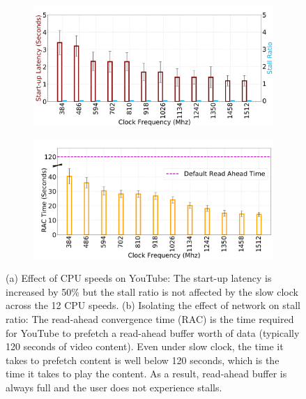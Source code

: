 \begin{figure}
    \begin{subfigure}[b]{0.5\textwidth}
        \centering
        \includegraphics[height=0.5\textwidth,width=1\textwidth]{sections/device-work/youtube-clock}
        \caption{}
    \end{subfigure}
    \begin{subfigure}[b]{0.5\textwidth}
        \centering
        \includegraphics[height=0.5\textwidth,width=1\textwidth]{sections/device-work/youtube-rac}
        \caption{}
    \end{subfigure}%
    \caption{(a) Effect of CPU speeds on YouTube: The start-up latency is increased by 50\% but the stall ratio is not affected by the slow clock across the 12 CPU speeds. (b) Isolating the effect of network on stall ratio: The read-ahead convergence time (RAC) is the time required for YouTube to prefetch a read-ahead buffer worth of data (typically 120 seconds of video content). Even under slow clock, the time it takes to prefetch content is well below 120 seconds, which is the time it takes to play the content. As a result, read-ahead buffer is always full and the user does not experience stalls. }
   \vspace{-0.2in}
  \label{fig:youtube}
\end{figure}
 

